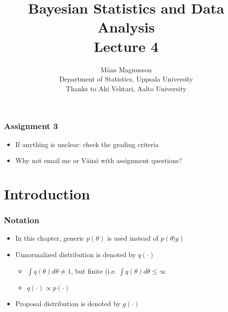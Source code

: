 \documentclass[10pt]{beamer}
\title[]{{\color{black}Bayesian Statistics and Data Analysis \\ Lecture 4}}
\author[]{M{\aa}ns Magnusson \\ Department of Statistics, Uppsala University \\ Thanks to Aki Vehtari, Aalto University}
\date{}
\begin{document}
\frame{\titlepage
}






\begin{frame}

\frametitle{Assignment 3}

  \begin{itemize}
  \item If anything is unclear: check the grading criteria
  \item Why not email me or Väinö with assignment questions?
  \end{itemize}

\end{frame}

\section{Introduction}

\begin{frame}

\frametitle{Notation}

  \begin{itemize}
  \item In this chapter, generic $p(\theta)$ is used instead of
    $p(\theta|y)$
  \item Unnormalized distribution is denoted by $q(\cdot)$
    \begin{itemize}
    \item $\int q(\theta) d\theta \neq 1$, but finite (i.e. $\int q(\theta) d\theta \le \infty$
    \item $q(\cdot) \propto p(\cdot)$
    \end{itemize}
  \item Proposal distribution is denoted by $g(\cdot)$
  \end{itemize}

\end{frame}
\end{document}
